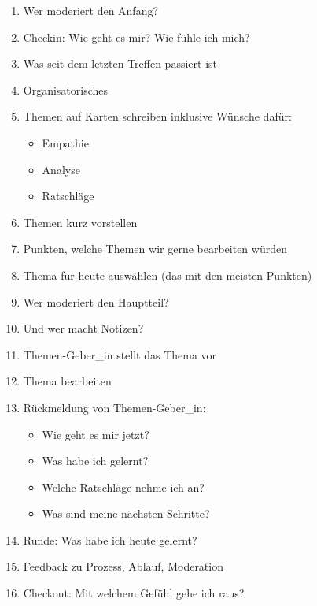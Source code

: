 \begin{enumerate}
  \item Wer moderiert den Anfang?
  \item Checkin: Wie geht es mir? Wie fühle ich mich?
  \item Was seit dem letzten Treffen passiert ist
  \item Organisatorisches
  \item Themen auf Karten schreiben inklusive Wünsche dafür:
    \begin{itemize}
      \item Empathie
      \item Analyse
      \item Ratschläge
    \end{itemize}
  \item Themen kurz vorstellen
  \item Punkten, welche Themen wir gerne bearbeiten würden
  \item Thema für heute auswählen (das mit den meisten Punkten)
  \item Wer moderiert den Hauptteil?
  \item Und wer macht Notizen?
  \item Themen-Geber\_in stellt das Thema vor
  \item Thema bearbeiten
  \item Rückmeldung von Themen-Geber\_in:
    \begin{itemize}
      \item Wie geht es mir jetzt?
      \item Was habe ich gelernt?
      \item Welche Ratschläge nehme ich an?
      \item Was sind meine nächsten Schritte?
    \end{itemize}
  \item Runde: Was habe ich heute gelernt?
  \item Feedback zu Prozess, Ablauf, Moderation
  \item Checkout: Mit welchem Gefühl gehe ich raus?
\end{enumerate}
